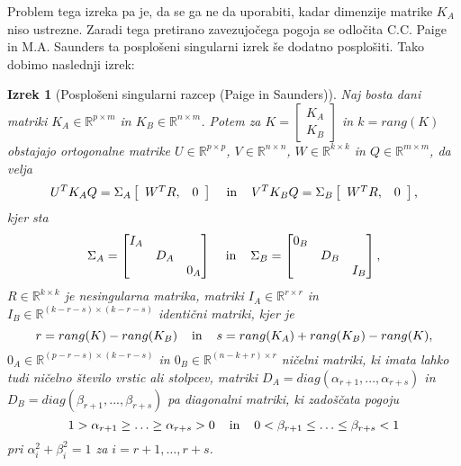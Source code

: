 \documentclass[mat1]{article}
\newtheorem{izrek}{Izrek}
\begin{document}
Problem tega izreka pa je, da se ga ne da uporabiti, kadar dimenzije matrike $K_A$ niso ustrezne. Zaradi tega pretirano zavezujočega pogoja se odločita C.C. Paige in M.A. Saunders ta posplošeni singularni izrek še dodatno posplošiti. Tako dobimo naslednji izrek:
\begin{izrek}[Posplošeni singularni razcep (Paige in Saunders)]
\label{izrek:GSVD} Naj bosta dani matriki $K_A \in \mathbb{R}^{p \times m}$ in $K_B \in \mathbb{R}^{n \times m}$. Potem za $K = \left[\begin{array}{c} K_A \\ K_B \end{array}\right]$ in $k = rang(K)$ obstajajo ortogonalne matrike $U \in \mathbb{R}^{p \times p}$, $V \in \mathbb{R}^{n \times n}$, $W \in \mathbb{R}^{k \times k}$ in $Q \in \mathbb{R}^{m \times m}$, da velja 
\begin{equation} \label{eq4}
U^T K_A Q = \Sigma_A  \left[\begin{array}{cc} W^T R, & 0 \end{array}\right] \hspace{4mm} \text{in} \hspace{4mm} V^T K_B Q = \Sigma_B  \left[\begin{array}{cc} W^T R, & 0 \end{array}\right] \text{,}
\end{equation} kjer sta
$$\Sigma_A = \begin{bmatrix} 
I_A &  & \\
 & D_A & \\
 & & 0_A  
\end{bmatrix} \hspace{4mm} \text{in} \hspace{4mm}
\Sigma_B = \begin{bmatrix} 
0_B &  & \\
 & D_B & \\
 & & I_B  
\end{bmatrix} \text{,}$$ 
$R \in \mathbb{R}^{k \times k}$ je nesingularna matrika, matriki $I_A \in \mathbb{R}^{r \times r}$ in $I_B \in \mathbb{R}^{(k-r-s) \times (k-r-s)}$ identični matriki, kjer je 
$$r = rang(K) - rang(K_B) \hspace{4mm} \text{in} \hspace{4mm} s = rang(K_A) + rang(K_B) - rang(K),$$
$0_A \in \mathbb{R}^{(p-r-s) \times (k-r-s)}$ in $0_B \in \mathbb{R}^{(n-k+r) \times r}$ ničelni matriki, ki imata lahko tudi ničelno število vrstic ali stolpcev, matriki
$D_A = diag(\alpha_{r+1},..., \alpha_{r+s})$ in $D_B = diag(\beta_{r+1},..., \beta_{r+s})$ pa diagonalni matriki, ki zadoščata pogoju
$$1 > \alpha_{r+1} \geq \ldots \geq \alpha_{r+s} > 0 \hspace{4mm} \text{in} \hspace{4mm} 0 < \beta_{r+1} \leq \ldots \leq \beta_{r+s} < 1$$
pri $\alpha_i^2 + \beta_i^2 = 1$ za $ i = r+1,\ldots, r+s$.
\end{izrek}
\end{document}

